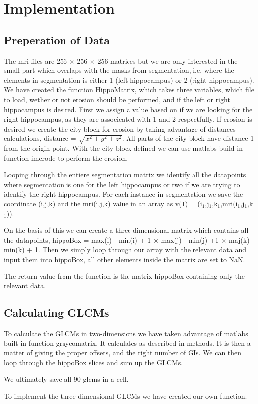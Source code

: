 \chapter{Implementation}

\section{Preperation of Data}
The mri files are 256 $\times$ 256 $\times$ 256 matrices but we are only interested in the small part which overlaps with the masks from segmentation, i.e. where the elements in segmentation is either 1 (left hippocampus) or 2 (right hippocampus). 
We have created the function HippoMatrix, which takes three variables, which file to load, wether or not erosion should be performed, and if the left or right hippocampus is desired.
First we assign a value based on if we are looking for the right hippocampus, as they are associeated with 1 and 2 respectfully.
If erosion is desired we create the city-block for erosion by taking advantage of distances calculations, distance = $\sqrt{x^2+y^2+z^2}$. All parts of the city-block have distance 1 from the origin point. With the city-block defined we can use matlabs build in function imerode to perform the erosion. 

Looping through the entiere segmentation matrix we identify all the datapoints where segmentation is one for the left hippocampus or two if we are trying to identify the right hippocampus. For each instance in segmentation we save the coordinate (i,j,k) and the mri(i,j,k) value in an array as v(1) = (i$_1$,j$_1$,k$_1$,mri(i$_1$,j$_1$,k$_1$)).

On the basis of this we can create a three-dimensional matrix which contains all the datapoints, hippoBox = max(i) - min(i) + 1 $\times$ max(j) - min(j) +1 $\times$ maj(k) - min(k) + 1.
Then we simply loop through our array with the relevant data and input them into hippoBox, all other elements inside the matrix are set to NaN. 

The return value from the function is the matrix hippoBox containing only the relevant data. 

\section{Calculating GLCMs}

 To calculate the GLCMs in two-dimensions we have taken advantage of matlabs built-in function graycomatrix. It calculates as described in methods. It is then a matter of giving the proper offsets, and the right number of GIs. We can then loop through the hippoBox slices and sum up the GLCMs.

We ultimately save all 90 glcms in a cell.

To implement the three-dimensional GLCMs we have created our own function.


